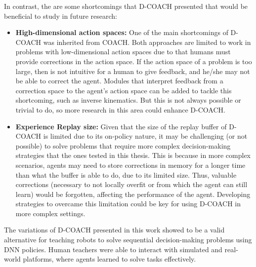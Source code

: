 In contrast, the are some shortcomings that D-COACH presented that would be beneficial to study in future research:
\begin{itemize}
    \item \textbf{High-dimensional action spaces:} One of the main shortcomings of D-COACH was inherited from COACH. Both approaches are limited to work in problems with low-dimensional action spaces due to that humans must provide corrections in the action space. If the action space of a problem is too large, then is not intuitive for a human to give feedback, and he/she may not be able to correct the agent. Modules that interpret feedback from a correction space to the agent's action space can be added to tackle this shortcoming, such as inverse kinematics. But this is not always possible or trivial to do, so more research in this area could enhance D-COACH.
    \item \textbf{Experience Replay size:} Given that the size of the replay buffer of D-COACH is limited due to its on-policy nature, it may be challenging (or not possible) to solve problems that require more complex decision-making strategies that the ones tested in this thesis. This is because in more complex scenarios, agents may need to store corrections in memory for a longer time than what the buffer is able to do, due to its limited size. Thus, valuable corrections (necessary to not locally overfit or from which the agent can still learn) would be forgotten, affecting the performance of the agent. Developing strategies to overcame this limitation could be key for using D-COACH in more complex settings. 
\end{itemize}

The variations of D-COACH presented in this work showed to be a valid alternative for teaching robots to solve sequential decision-making problems using DNN policies. Human teachers were able to interact with simulated and real-world platforms, where agents learned to solve tasks effectively.